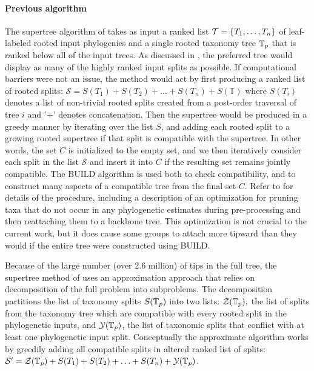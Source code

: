 \documentclass[english]{article}
\begin{document}
\paragraph{Previous algorithm}

The supertree algorithm of \citet{redelings2017supertree} takes as input a
ranked list $\mathcal{T}=\left\{ T_{1},\ldots,T_{n}\right\} $ of leaf-labeled rooted input phylogenies and a
single rooted taxonomy tree $\mbox{\ensuremath{\mathbb{T}}}_{p}$ that is ranked below all of the input trees.
As discussed in \citet{redelings2017supertree}, the preferred tree would
display as many of the highly ranked input splits as possible. If computational
barriers were not an issue, the method would act by first producing a ranked
list of rooted splits: $\mathcal{S}=S(T_{1})+S(T_{2})+\ldots+S(T_{n})+S(\mathbb{T})$ where $S(T_{i})$ denotes a list
of non-trivial rooted splits created from a post-order traversal of tree $i$ and '$+$'
denotes concatenation. Then the supertree would be produced in a greedy manner
by iterating over the list $S$, and adding each rooted split to a growing rooted
supertree if that split is compatible with the supertree. In other words, the set
$C$ is initialized to the empty set, and we then iteratively consider each split in
the list $\mathcal{S}$ and insert it into $C$ if the resulting set remains jointly compatible.
The BUILD algorithm \citep{AhoSSU1981} is used both to check compatibility,  and
to construct many aspects of a compatible tree from the final set $C$.  Refer to
\citet{redelings2017supertree} for details of the procedure, including a
description of an optimization for pruning taxa that do not occur in any
phylogenetic estimates during pre-processing and then reattaching them to a
backbone tree.  This optimization is not crucial to the current work, but it
does cause some groups to attach more tipward than they would if the entire tree
were constructed using BUILD.

Because of the large number (over 2.6 million) of tips in the full tree, the
supertree method of \citet{redelings2017supertree} uses an approximation
approach that relies on decomposition of the full problem into subproblems.
The decomposition partitions the list of taxonomy splits $S(\mbox{\ensuremath{\mathbb{T}}}_{p})$ into two lists:
$\mathcal{Z}(\mbox{\ensuremath{\mathbb{T}}}_{p}),$ the list of splits from the taxonomy tree which are compatible with every
rooted split in the phylogenetic inputs, and $\mathcal{Y}(\mbox{\ensuremath{\mathbb{T}}}_{p})$, the list of taxonomic splits
that conflict with at least one phylogenetic input split. Conceptually the
approximate algorithm works by greedily adding all compatible splits in
altered ranked list of splits: $\mathcal{S}^{\prime}=\mathcal{Z}(\mbox{\ensuremath{\mathbb{T}}}_{p})+S(T_{1})+S(T_{2})+\ldots+S(T_{n})+\mathcal{Y}(\mbox{\ensuremath{\mathbb{T}}}_{p})$.
\end{document}
